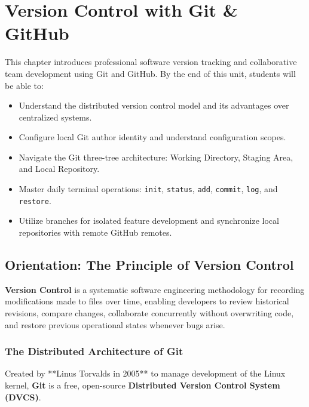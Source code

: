 \chapter{Version Control with Git \& GitHub}
\label{chap:version_control}

\begin{tcolorbox}[enhanced, colback=boxnavybg, colframe=brandnavy, boxrule=1.2pt, arc=4pt, title={\Large\bfseries\sffamily Unit 5 Overview \& Learning Objectives}]
\sffamily\normalsize
This chapter introduces professional software version tracking and collaborative team development using Git and GitHub. By the end of this unit, students will be able to:
\begin{itemize}[leftmargin=1.2em, itemsep=2pt, topsep=3pt]
    \item Understand the distributed version control model and its advantages over centralized systems.
    \item Configure local Git author identity and understand configuration scopes.
    \item Navigate the Git three-tree architecture: Working Directory, Staging Area, and Local Repository.
    \item Master daily terminal operations: \texttt{init}, \texttt{status}, \texttt{add}, \texttt{commit}, \texttt{log}, and \texttt{restore}.
    \item Utilize branches for isolated feature development and synchronize local repositories with remote GitHub remotes.
\end{itemize}
\end{tcolorbox}

\section{Orientation: The Principle of Version Control}

\textbf{Version Control} is a systematic software engineering methodology for recording modifications made to files over time, enabling developers to review historical revisions, compare changes, collaborate concurrently without overwriting code, and restore previous operational states whenever bugs arise.

\subsection{The Distributed Architecture of Git}
Created by **Linus Torvalds in 2005** to manage development of the Linux kernel, \textbf{Git} is a free, open-source \textbf{Distributed Version Control System (DVCS)}. 

